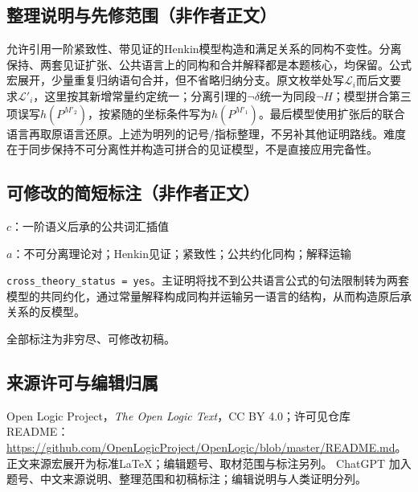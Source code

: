 \documentclass[UTF8,11pt]{ctexart}
\theoremstyle{definition}
\begin{document}
\subsection*{整理说明与先修范围（非作者正文）}
允许引用一阶紧致性、带见证的Henkin模型构造和满足关系的同构不变性。分离保持、两套见证扩张、公共语言上的同构和合并解释都是本题核心，均保留。公式宏展开，少量重复归纳语句合并，但不省略归纳分支。原文枚举处写$\mathcal L_i$而后文要求$\mathcal L'_i$，这里按其新增常量约定统一；分离引理的$\neg\delta$统一为同段$\neg H$；模型拼合第三项误写$h(P^{M'_2})$，按紧随的坐标条件写为$h(P^{M'_1})$。最后模型使用扩张后的联合语言再取原语言还原。上述为明列的记号/指标整理，不另补其他证明路线。难度在于同步保持不可分离性并构造可拼合的见证模型，不是直接应用完备性。
\subsection*{可修改的简短标注（非作者正文）}
$c$：一阶语义后承的公共词汇插值

$a$：不可分离理论对；Henkin见证；紧致性；公共约化同构；解释运输

\texttt{cross\_theory\_status = yes}。主证明将找不到公共语言公式的句法限制转为两套模型的共同约化，通过常量解释构成同构并运输另一语言的结构，从而构造原后承关系的反模型。

全部标注为非穷尽、可修改初稿。
\subsection*{来源许可与编辑归属}
Open Logic Project，\emph{The Open Logic Text}，CC BY 4.0；许可见仓库README：\url{https://github.com/OpenLogicProject/OpenLogic/blob/master/README.md}。正文来源宏展开为标准LaTeX；编辑题号、取材范围与标注另列。
ChatGPT 加入题号、中文来源说明、整理范围和初稿标注；编辑说明与人类证明分列。
\end{document}
